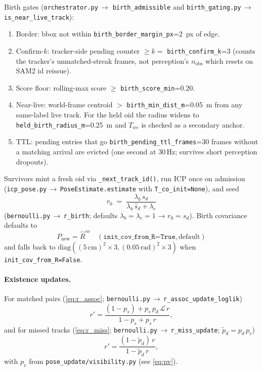 \documentclass[11pt]{article}
\newcommand{\file}[1]{\texttt{#1}}
\begin{document}
Birth gates (\file{orchestrator.py}\,$\to$ \texttt{birth\_admissible}
and \file{birth\_gating.py}\,$\to$ \texttt{is\_near\_live\_track}):
\begin{enumerate}
\item Border: bbox not within \texttt{birth\_border\_margin\_px}=2~px of edge.
\item Confirm-$k$: tracker-side pending counter $\ge k = $
  \texttt{birth\_confirm\_k}=3 (counts the tracker's unmatched-streak
  frames, not perception's $n_{\text{obs}}$ which resets on SAM2 id reissue).
\item Score floor: rolling-max score $\ge $ \texttt{birth\_score\_min}=0.20.
\item Near-live: world-frame centroid $> $ \texttt{birth\_min\_dist\_m}=0.05~m
  from any same-label live track. For the held oid the radius widens to
  \texttt{held\_birth\_radius\_m}=0.25~m and $T_{we}$ is checked as a
  secondary anchor.
\item TTL: pending entries that go \texttt{birth\_pending\_ttl\_frames}=30
  frames without a matching arrival are evicted (one second at 30\,Hz;
  survives short perception dropouts).
\end{enumerate}
Survivors mint a fresh oid via \texttt{\_next\_track\_id()}, run ICP
once on admission (\file{icp\_pose.py}\,$\to$\,\texttt{PoseEstimate.estimate}
with \texttt{T\_co\_init=None}), and seed
\begin{equation}\label{eq:birth_r}
r_0 \;=\; \frac{\lambda_b\,\hat s_d}{\lambda_b\,\hat s_d + \lambda_c}
\end{equation}
(\file{bernoulli.py}\,$\to$\,\texttt{r\_birth}; defaults
$\lambda_b=\lambda_c=1$ → $r_0=\hat s_d$). Birth covariance defaults to
\begin{equation}\label{eq:birth_state}
P_{\text{new}} = \hat R^{co} \quad (\texttt{init\_cov\_from\_R=True}, \text{default})
\end{equation}
and falls back to $\mathrm{diag}((5\,\text{cm})^2{\times}3,(0.05\,\text{rad})^2{\times}3)$
when \texttt{init\_cov\_from\_R=False}.

\paragraph{Existence updates.}
For matched pairs (\eqref{eq:r_assoc};
\file{bernoulli.py}\,$\to$\,\texttt{r\_assoc\_update\_loglik})
\begin{equation}\label{eq:r_assoc}
r' = \frac{(1 - p_s) + p_s\,p_d\,\mathcal L\,r}{1 - p_s + p_s\,r},
\end{equation}
and for missed tracks (\eqref{eq:r_miss};
\file{bernoulli.py}\,$\to$\,\texttt{r\_miss\_update}; $\tilde p_d = p_d\,p_v$)
\begin{equation}\label{eq:r_miss}
r' = \frac{(1 - \tilde p_d)\,r}{1 - \tilde p_d\,r},
\end{equation}
with $p_v$ from \file{pose\_update/visibility.py} (see \eqref{eq:pv}).
\end{document}
